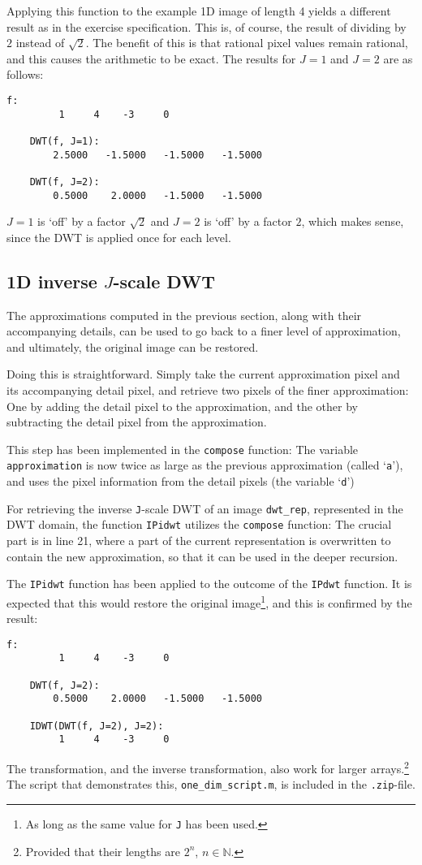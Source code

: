 Applying this function to the example 1D image of length 4 yields a different result as in the exercise specification.
This is, of course, the result of dividing by \(2\) instead of \(\sqrt{2}\).
The benefit of this is that rational pixel values remain rational, and this causes the arithmetic to be exact.
The results for \(J=1\) and \(J=2\) are as follows:
\begin{lstlisting}[basicstyle=\ttfamily\small]
    f:
         1     4    -3     0

    DWT(f, J=1):
        2.5000   -1.5000   -1.5000   -1.5000

    DWT(f, J=2):
        0.5000    2.0000   -1.5000   -1.5000
\end{lstlisting}
\(J=1\) is `off' by a factor \(\sqrt{2}\) and \(J=2\) is `off' by a factor \(2\), which makes sense, since the DWT is applied once for each level.

\subsection{\texorpdfstring{1D inverse \(J\)-scale DWT}{1D inverse J-scale DWT}}
The approximations computed in the previous section, along with their accompanying details, can be used to go back to a finer level of approximation, and ultimately, the original image can be restored.

Doing this is straightforward.
Simply take the current approximation pixel and its accompanying detail pixel, and retrieve two pixels of the finer approximation:
One by adding the detail pixel to the approximation, and the other by subtracting the detail pixel from the approximation.

This step has been implemented in the \texttt{compose} function:
The variable \texttt{approximation} is now twice as large as the previous approximation (called `\texttt{a}'), and uses the pixel information from the detail pixels (the variable `\texttt{d}') 

For retrieving the inverse \texttt{J}-scale DWT of an image \texttt{dwt\_rep}, represented in the DWT domain, the function \texttt{IPidwt} utilizes the \texttt{compose} function:
The crucial part is in line 21, where a part of the current representation is overwritten to contain the new approximation, so that it can be used in the deeper recursion.

The \texttt{IPidwt} function has been applied to the outcome of the \texttt{IPdwt} function.
It is expected that this would restore the original image\footnote{As long as the same value for \texttt{J} has been used.}, and this is confirmed by the result:
\begin{lstlisting}[basicstyle=\ttfamily\small]
    f:
         1     4    -3     0

    DWT(f, J=2):
        0.5000    2.0000   -1.5000   -1.5000

    IDWT(DWT(f, J=2), J=2):
         1     4    -3     0
\end{lstlisting}

The transformation, and the inverse transformation, also work for larger arrays.\footnote{Provided that their lengths are \(2^n\), \(n \in \mathbb{N}\).}
The script that demonstrates this, \texttt{one\_dim\_script.m}, is included in the \texttt{.zip}-file.

\clearpage